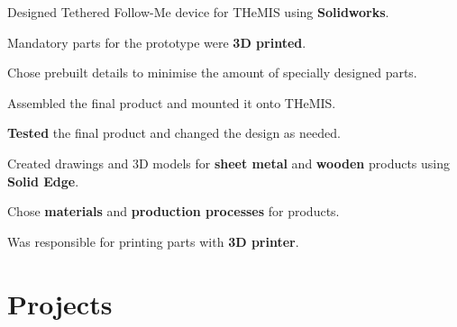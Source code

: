 \documentclass[letterpaper]{deedy-resume} %
\begin{document}
\begin{minipage}[t]{0.66\textwidth}
\sectionspace %



\begin{tightitemize}
  \item Designed Tethered Follow-Me device for THeMIS using \textbf{Solidworks}.
  \item Mandatory parts for the prototype were \textbf{3D printed}.
  \item Chose prebuilt details to minimise the amount of specially designed parts.
  \item Assembled the final product and mounted it onto THeMIS.
  \item \textbf{Tested} the final product and changed the design as needed.
\end{tightitemize}

\sectionspace %



\begin{tightitemize}
  \item Created drawings and 3D models for \textbf{sheet metal} and \textbf{wooden} products using \textbf{Solid Edge}.
  \item Chose \textbf{materials} and \textbf{production processes} for products.
  \item Was responsible for printing parts with \textbf{3D printer}.
\end{tightitemize}

\sectionspace %



\section{Projects}


\end{minipage}
\end{document}
